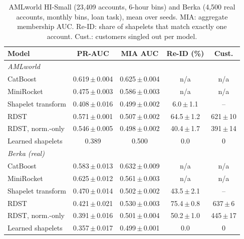 \begin{table}[t]
\caption{AMLworld HI-Small (23,409 accounts, 6-hour bins) and Berka (4,500 real accounts, monthly bins, loan task), mean over seeds. MIA: aggregate membership AUC. Re-ID: share of shapelets that match exactly one account. Cust.: customers singled out per model.}
\label{tab:aml}
\small\setlength{\tabcolsep}{2.5pt}
\centering
\begin{tabular}{lcccc}
\toprule
Model & PR-AUC & MIA AUC & Re-ID (\%) & Cust. \\
\midrule
\multicolumn{5}{l}{\emph{AMLworld}} \\
CatBoost & 0.619\,$\pm$\,0.004 & 0.625\,$\pm$\,0.004 & n/a & n/a \\
MiniRocket & 0.475\,$\pm$\,0.003 & 0.586\,$\pm$\,0.003 & n/a & n/a \\
Shapelet transform & 0.408\,$\pm$\,0.016 & 0.499\,$\pm$\,0.002 & 6.0\,$\pm$\,1.1 & -- \\
RDST & 0.571\,$\pm$\,0.001 & 0.507\,$\pm$\,0.002 & 64.5\,$\pm$\,1.2 & 621\,$\pm$\,10 \\
RDST, norm.-only & 0.546\,$\pm$\,0.005 & 0.498\,$\pm$\,0.002 & 40.4\,$\pm$\,1.7 & 391\,$\pm$\,14 \\
Learned shapelets & 0.389 & 0.500 & 0.0 & 0 \\
\multicolumn{5}{l}{\emph{Berka (real)}} \\
CatBoost & 0.583\,$\pm$\,0.013 & 0.632\,$\pm$\,0.009 & n/a & n/a \\
MiniRocket & 0.625\,$\pm$\,0.012 & 0.561\,$\pm$\,0.003 & n/a & n/a \\
Shapelet transform & 0.470\,$\pm$\,0.014 & 0.502\,$\pm$\,0.002 & 43.5\,$\pm$\,2.1 & -- \\
RDST & 0.421\,$\pm$\,0.021 & 0.530\,$\pm$\,0.003 & 75.4\,$\pm$\,0.8 & 637\,$\pm$\,6 \\
RDST, norm.-only & 0.391\,$\pm$\,0.016 & 0.501\,$\pm$\,0.004 & 50.2\,$\pm$\,1.0 & 445\,$\pm$\,17 \\
Learned shapelets & 0.357\,$\pm$\,0.017 & 0.499\,$\pm$\,0.001 & 0.0 & 0 \\
\bottomrule\end{tabular}\end{table}
